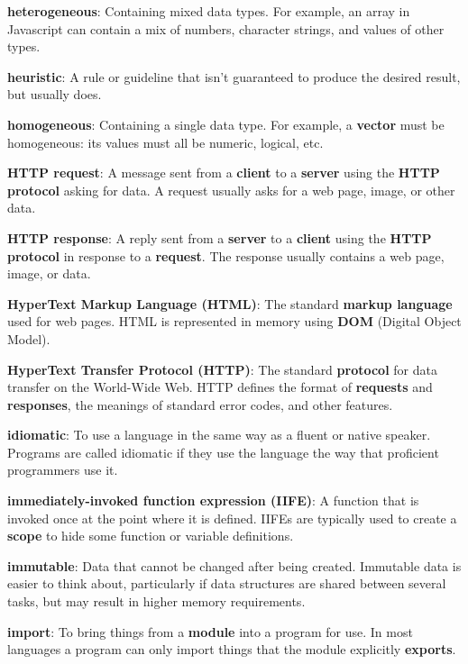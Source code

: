 \documentclass[krantzl]{krantz}
\newcommand{\glosskey}[1]{\textbf{#1}}
\begin{document}
\noindent \textbf{\glosskey{heterogeneous}}: 
Containing mixed data types. For example, an array in Javascript can contain a mix of numbers, character strings, and values of other types.


\noindent \textbf{\glosskey{heuristic}}: 
A rule or guideline that isn't guaranteed to produce the desired result, but usually does.


\noindent \textbf{\glosskey{homogeneous}}: 
Containing a single data type. For example, a \glosskey{vector} must be homogeneous: its values must all be numeric, logical, etc.


\noindent \textbf{\glosskey{HTTP request}}: 
A message sent from a \glosskey{client} to a \glosskey{server} using the \glosskey{HTTP} \glosskey{protocol} asking for data. A request usually asks for a web page, image, or other data.


\noindent \textbf{\glosskey{HTTP response}}: 
A reply sent from a \glosskey{server} to a \glosskey{client} using the \glosskey{HTTP} \glosskey{protocol} in response to a \glosskey{request}. The response usually contains a web page, image, or data.


\noindent \textbf{\glosskey{HyperText Markup Language} (HTML)}: 
The standard \glosskey{markup language} used for web pages. HTML is represented in memory using \glosskey{DOM} (Digital Object Model).


\noindent \textbf{\glosskey{HyperText Transfer Protocol} (HTTP)}: 
The standard \glosskey{protocol} for data transfer on the World-Wide Web. HTTP defines the format of \glosskey{requests} and \glosskey{responses}, the meanings of standard error codes, and other features.


\noindent \textbf{\glosskey{idiomatic}}: 
To use a language in the same way as a fluent or native speaker. Programs are called idiomatic if they use the language the way that proficient programmers use it.


\noindent \textbf{\glosskey{immediately-invoked function expression} (IIFE)}: 
A function that is invoked once at the point where it is defined.  IIFEs are typically used to create a \glosskey{scope} to hide some function or variable definitions.


\noindent \textbf{\glosskey{immutable}}: 
Data that cannot be changed after being created. Immutable data is easier to think about, particularly if data structures are shared between several tasks, but may result in higher memory requirements.


\noindent \textbf{\glosskey{import}}: 
To bring things from a \glosskey{module} into a program for use. In most languages a program can only import things that the module explicitly \glosskey{exports}.
\end{document}
